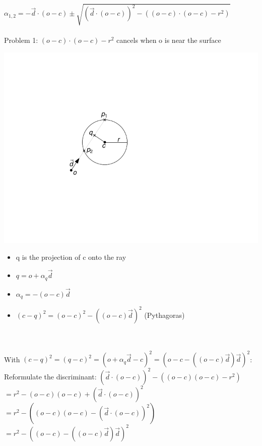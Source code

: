 \documentclass[utf8,stillsansserifmath,fleqn,t]{beamer}
\begin{document}
\begin{frame}
\frametitle{\insertsection}
$\alpha_{1,2} = -\vec{d}\cdot(o-c) \pm \sqrt{(\vec{d}\cdot(o-c))^2 - ((o-c)\cdot(o-c)-r^2)}$\\~\\
Problem 1: $(o-c)\cdot(o-c)-r^2$ cancels when o is near the surface\\
\begin{minipage}{.24\textwidth}
\includegraphics[width=\textwidth]{./fig/sphere-2.pdf}
\end{minipage}\hfill
\begin{minipage}{.64\textwidth}
\begin{itemize}
\item q is the projection of c onto the ray
\item $q = o + \alpha_q \vec{d}$
\item $\alpha_q= -(o-c)\vec{d}$
\item $(c-q)^2 = (o-c)^2 - ((o-c)\vec{d})^2$ (Pythagoras)
\end{itemize}
\end{minipage}\\~\\[.5ex]
With $(c-q)^2 = (q-c)^2=(o+\alpha_q\vec{d}-c)^2=
(o-c-((o-c)\vec{d})\vec{d})^2$:\\
Reformulate the discriminant:
$(\vec{d}\cdot(o-c))^2 - ((o-c)(o-c)-r^2)$
$= r^2 - (o-c)(o-c) + (\vec{d}\cdot(o-c))^2$
$= r^2 - ((o-c)(o-c) - (\vec{d}\cdot(o-c))^2)$\\
$= r^2 - ((o-c) - ((o-c)\vec{d})\vec{d})^2$
\end{frame}
\end{document}
